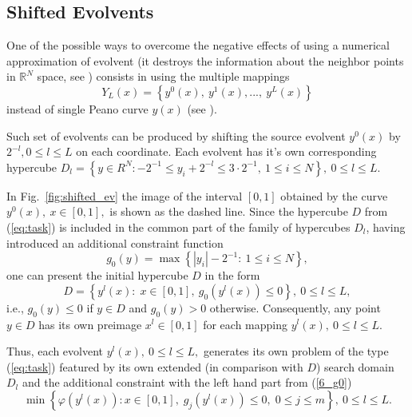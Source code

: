 \documentclass[runningheads]{llncs}
\begin{document}
\subsection{Shifted Evolvents}
\label{sec:shifted}

One of the possible ways to overcome the negative effects of using a numerical
approximation of evolvent (it destroys the information about the neighbor points in $\mathbb{R}^N$ space,
see \cite{Strongin1992}) consists in using the multiple mappings
\begin{equation}%
Y_L(x)=\left\{y^0(x),\ y^1(x),...,\ y^L(x)\right\}
\end{equation}
instead of single Peano curve $y(x)$ (see \cite{Strongin1992,strSergGO,Strongin1991}).

Such set of evolvents can be produced by shifting the source evolvent $y^0(x)$ by $2^{-l},0
\leq l \leq L$ on each coordinate. Each evolvent has it's own corresponding hypercube $D_l=
\left\{y \in R^N: -2^{-1} \leq y_i+2^{-l} \leq 3 \cdot 2^{-1},\ 1\leq i\leq N\right\},\ 0 \leq l \leq
L$.

In Fig.~\ref{fig:shifted_ev} the image of the interval $[0,1]$ obtained by the curve $y^0(x),\
x\in [0,1],$ is shown as the dashed line. Since the hypercube $D$ from (\ref{eq:task}) is
included in the common part of the family of hypercubes $D_l$, having introduced an additional constraint
function
\begin{equation}\label{6_g0}
g_0(y)=\max\left\{\left|y_i\right| - 2^{-1}:\ 1\leq i\leq N\right\},
\end{equation}
one can present the initial hypercube $D$ in the form
\[
D=\left\{y^l(x):\; x\in [0,1],\ g_0(y^l(x))\leq 0 \right\},\ 0\leq l \leq L,
\]
i.e., $g_0(y) \leq 0$ if $y\in D$ and $g_0(y)>0$ otherwise. Consequently, any point $y \in D$
has its own preimage $x^l \in [0,1]$ for each mapping $y^l(x),\ 0\leq l\leq L$.

Thus, each evolvent $y^l(x),\ 0\leq l \leq L,$ generates its own problem of the type
(\ref{eq:task}) featured by its own extended (in comparison with $D$) search domain $D_l$
and the additional constraint with the left hand part from (\ref{6_g0})
\begin{equation}\label{6_problem_l}
\min{\left\{\varphi(y^l(x)):x\in [0,1], \; g_j(y^l(x))\leq 0, \; 0 \leq j \leq m\right\}}, \ 0 \leq l \leq L.
\end{equation}
\end{document}
